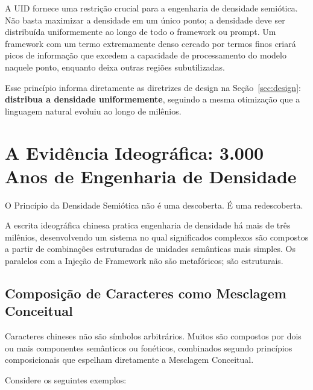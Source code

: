 \documentclass[12pt,a4paper]{article}
\begin{document}
A UID fornece uma restrição crucial para a engenharia de densidade semiótica.
Não basta maximizar a densidade em um único ponto; a densidade deve ser distribuída uniformemente ao longo de todo o framework ou prompt.
Um framework com um termo extremamente denso cercado por termos finos criará picos de informação que excedem a capacidade de processamento do modelo naquele ponto, enquanto deixa outras regiões subutilizadas.

Esse princípio informa diretamente as diretrizes de design na Seção~\ref{sec:design}: \textbf{distribua a densidade uniformemente}, seguindo a mesma otimização que a linguagem natural evoluiu ao longo de milênios.


\section{A Evidência Ideográfica: 3.000 Anos de Engenharia de Densidade}
\label{sec:ideographic}

O Princípio da Densidade Semiótica não é uma descoberta.
É uma redescoberta.

A escrita ideográfica chinesa pratica engenharia de densidade há mais de três milênios, desenvolvendo um sistema no qual significados complexos são compostos a partir de combinações estruturadas de unidades semânticas mais simples.
Os paralelos com a Injeção de Framework não são metafóricos; são estruturais.

\subsection{Composição de Caracteres como Mesclagem Conceitual}
\label{subsec:composition}

Caracteres chineses não são símbolos arbitrários.
Muitos são compostos por dois ou mais componentes semânticos ou fonéticos, combinados segundo princípios composicionais que espelham diretamente a Mesclagem Conceitual.

Considere os seguintes exemplos:
\end{document}
